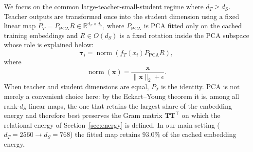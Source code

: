 \documentclass[11pt]{article}
\begin{document}
We focus on the common large-teacher-small-student regime where
$d_T\ge d_S$. Teacher outputs are transformed once into the student
dimension using a fixed linear map
$P_T=P_{\mathrm{PCA}}R\in\mathbb{R}^{d_T\times d_S}$, where
$P_{\mathrm{PCA}}$ is PCA fitted only on the cached training embeddings and
$R\in O(d_S)$ is a fixed rotation inside the PCA subspace whose role is
explained below:
\begin{equation}
    \boldsymbol{\tau}_i
    =
    \operatorname{norm}
    \left(
        f_T(x_i)P_{\mathrm{PCA}}R
    \right),
    \label{eq:teacher_embedding}
\end{equation}
where
\begin{equation}
    \operatorname{norm}(\mathbf{x})
    =
    \frac{\mathbf{x}}
         {\|\mathbf{x}\|_2+\epsilon}.
\end{equation}
When teacher and student dimensions are equal, $P_T$ is the identity.
PCA is not merely a convenient choice here: by the Eckart--Young theorem it
is, among all rank-$d_S$ linear maps, the one that retains the largest share
of the embedding energy and therefore best preserves the Gram matrix
$\mathbf{T}\mathbf{T}^{\top}$ on which the relational energy of
Section~\ref{sec:energy} is defined. In our main setting
($d_T=2560\rightarrow d_S=768$) the fitted map retains $93.0\%$ of the
cached embedding energy.
\end{document}
